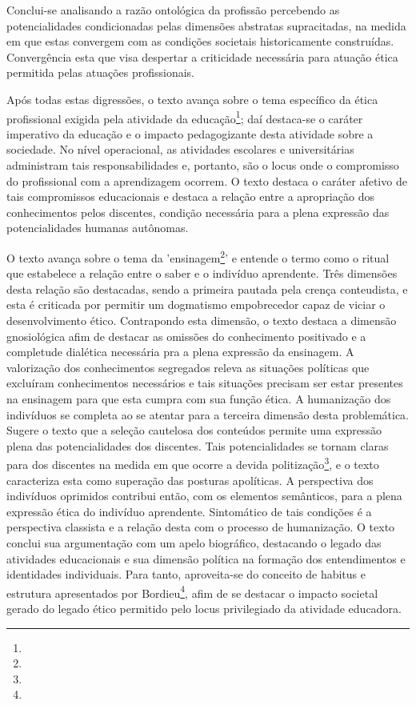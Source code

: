 \documentclass[
   article,       %
   12pt,          %
   oneside,       %
   a4paper,       %
   english,       %
   brazil,           %
   sumario=tradicional
   ]{abntex2}
\begin{document}
Conclui-se analisando a razão ontológica da profissão percebendo as potencialidades condicionadas pelas dimensões abstratas supracitadas, na medida em que estas convergem com as condições societais historicamente construídas. Convergência esta que visa despertar a criticidade necessária para atuação ética permitida pelas atuações profissionais.

Após todas estas digressões, o texto avança sobre o tema específico da ética profissional exigida pela atividade da educação\footnote{}; daí destaca-se o caráter imperativo da educação e o impacto pedagogizante desta atividade sobre a sociedade. No nível operacional, as atividades escolares e universitárias administram tais responsabilidades e, portanto, são o locus onde o compromisso do profissional com a aprendizagem ocorrem. O texto destaca o caráter afetivo de tais compromissos educacionais e destaca a relação entre a apropriação dos conhecimentos pelos discentes, condição necessária para a plena expressão das potencialidades humanas autônomas.

O texto avança sobre o tema da 'ensinagem\footnote{}' e entende o termo como o ritual que estabelece a relação entre o saber e o indivíduo aprendente. Três dimensões desta relação são destacadas, sendo a primeira pautada pela crença conteudista, e esta é criticada por permitir um dogmatismo empobrecedor capaz de viciar o desenvolvimento ético. Contrapondo esta dimensão, o texto destaca a dimensão gnosiológica afim de destacar as omissões do conhecimento positivado e a completude dialética necessária pra a plena expressão da ensinagem. A valorização dos conhecimentos segregados releva as situações políticas que excluíram conhecimentos necessários e tais situações precisam ser estar presentes na ensinagem para que esta cumpra com sua função ética. A humanização dos indivíduos se completa ao se atentar para a terceira dimensão desta problemática. Sugere o texto que a seleção cautelosa dos conteúdos permite uma expressão plena das potencialidades dos discentes. 
Tais potencialidades se tornam claras para dos discentes na medida em que ocorre a devida politização\footnote{}, e o texto caracteriza esta como superação das posturas apolíticas. A perspectiva dos indivíduos oprimidos contribui então, com os elementos semânticos, para a plena expressão ética do indivíduo aprendente. Sintomático de tais condições é a perspectiva classista e a relação desta com o processo de humanização. O texto conclui sua argumentação com um apelo biográfico, destacando o legado das atividades educacionais e sua dimensão política na formação dos entendimentos e identidades individuais. Para tanto, aproveita-se do conceito de habitus e estrutura apresentados por Bordieu\footnote{}, afim de se destacar o impacto societal gerado do legado ético permitido pelo locus privilegiado da atividade educadora.



\postextual


\end{document}

